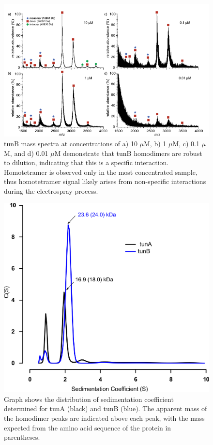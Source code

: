 \begin{figure}
\centering
	\includegraphics{ch3-S7_fig.png} 
\caption[tunB mass spectrometry dilution experiment]{tunB mass spectra at concentrations of a) 10 $\mu$M, b) 1 $\mu$M, c) 0.1 $\mu$M, and d) 0.01 $\mu$M demonstrate that tunB homodimers are robust to dilution, indicating that this is a specific interaction. Homotetramer is observed only in the most concentrated sample, thus homotetramer signal likely arises from non-specific interactions during the electrospray process.\label{samplefigure}}	
\end{figure}


\begin{figure}
\centering
	\includegraphics{ch3-S8_fig.png} 
\caption[Sedimentation velocity AUC analysis of tunA and tunB]{Graph shows the distribution of sedimentation coefficient determined for tunA (black) and tunB (blue). The apparent mass of the homodimer peaks are indicated above each peak, with the mass expected from the amino acid sequence of the protein in parentheses.\label{samplefigure}}	
\end{figure}







